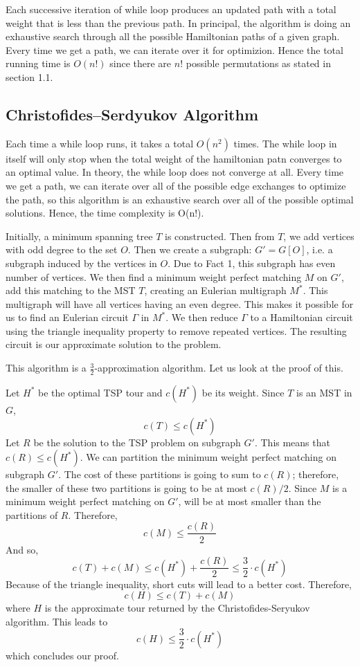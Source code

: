 \documentclass[12pt]{report}
\begin{document}
Each successive iteration of while loop produces an updated path with a total weight that is less than the previous path. In principal, the algorithm is doing an exhaustive search through all the possible Hamiltonian paths of a given graph. Every time we get a path, we can iterate over it for optimizion. Hence the total running time is $O(n!)$ since there are $n!$ possible permutations as stated in section 1.1.
\subsection{Christofides–Serdyukov Algorithm}
Each time a while loop runs, it takes a total $O(n^2)$ times. The while loop in itself will only stop when the total weight of the hamiltonian patn converges to an optimal value. In theory, the while loop does not converge at all. Every time we get a path, we can iterate over all of the possible edge exchanges to optimize the path, so this algorithm is an exhaustive search over all of the possible optimal solutions. Hence, the time complexity is O(n!).
\par
  Initially, a minimum spanning tree $T$ is constructed. Then from $T$, we add vertices with odd degree to the set $O$. 
  Then we create a subgraph: $G' = G[O]$, i.e. a subgraph induced by the vertices in $O$. Due to Fact 1, this subgraph has 
  even number of vertices. We then find a minimum weight perfect matching $M$ on $G'$, add this matching to the MST $T$, creating 
  an Eulerian multigraph $M^*$. This multigraph will have all vertices having an even degree. This makes it possible for us 
  to find an Eulerian circuit $\Gamma$ in $M^*$. We then reduce $\Gamma$ to a Hamiltonian circuit using the triangle inequality 
  property to remove repeated vertices. The resulting circuit is our approximate solution to the problem. 
  \par
  This algorithm is a $\frac{3}{2}$-approximation algorithm. Let us look at the proof of this. 
  
  \par
    Let $H^*$ be the optimal TSP tour and $c(H^*)$ be its weight. 
    Since $T$ is an MST in $G$, \[c(T) \leq c(H^*)\] 
    Let $R$ be the solution to the TSP problem on subgraph $G'$. This means that $c(R) \leq c(H^*)$. We can partition the minimum weight perfect matching 
    on subgraph $G'$. The cost of these partitions is going to sum to $c(R)$; therefore, the smaller of these two partitions is 
    going to be at most $c(R)/2$. Since $M$ is a minimum weight perfect matching on $G'$, will be at most smaller than the partitions of $R$. 
    Therefore, \[c(M) \leq \frac{c(R)}{2}\]
    And so, \[c(T) + c(M) \leq c(H^*) + \frac{c(R)}{2} \leq \frac{3}{2} \cdot c(H^*)\]
    Because of the triangle inequality, short cuts will lead to a better cost. Therefore, 
    \[c(H) \leq c(T) + c(M) \] where $H$ is the approximate tour returned by the Christofides-Seryukov algorithm. This leads to
    \[c(H) \leq \frac{3}{2} \cdot c(H^*)\]
    which concludes our proof.
  \par
\end{document}
